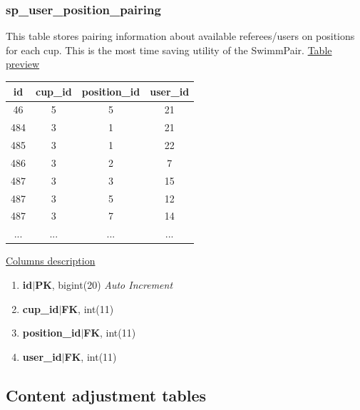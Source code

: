 \subsubsection*{sp\_user\_position\_pairing}
This table stores pairing information about available referees/users on positions for each cup. This is the most time saving utility of the SwimmPair.
\newline
\underline{Table preview}
\begin{center}
 \begin{tabular}{||c c c c||} 
 \hline
 id & cup\_id & position\_id & user\_id  \\ [0.5ex] 
 \hline\hline
 46 & 5 & 5 & 21 \\ 
 \hline
 484 & 3 & 1 & 21 \\ 
 \hline
 485 & 3 & 1 & 22 \\ 
 \hline
 486 & 3 & 2 & 7 \\
 \hline
 487 & 3 & 3 & 15 \\
 \hline
 487 & 3 & 5 & 12 \\
 \hline
 487 & 3 & 7 & 14 \\
 \hline
 ... & ... & ... & ... \\ [0.5ex] 
 \hline
\end{tabular}
\end{center}
\underline{Columns description}
\begin{enumerate}
  \setlength\itemsep{0em}
  \item \textbf{id$|$PK}, bigint(20) \textit{Auto Increment}
  \item \textbf{cup\_id$|$FK}, int(11)
  \item \textbf{position\_id$|$FK}, int(11)
  \item \textbf{user\_id$|$FK}, int(11)
\end{enumerate}
\newpage
\subsection{Content adjustment tables}
